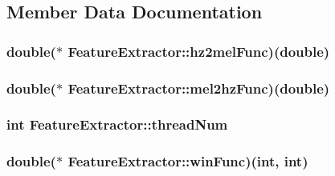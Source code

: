 \subsection{Member Data Documentation}
\hypertarget{class_feature_extractor_a5158d47cdf3ff7cfc48bde9c4169dfd2}{
\subsubsection[{hz2mel\+Func}]{\setlength{\rightskip}{0pt plus 5cm}double($\ast$ Feature\+Extractor\+::hz2mel\+Func)(double)\hspace{0.3cm}{\ttfamily [private]}}}\label{class_feature_extractor_a5158d47cdf3ff7cfc48bde9c4169dfd2}
\hypertarget{class_feature_extractor_a7b69346e500a23a96be63ebf891a069e}{
\subsubsection[{mel2hz\+Func}]{\setlength{\rightskip}{0pt plus 5cm}double($\ast$ Feature\+Extractor\+::mel2hz\+Func)(double)\hspace{0.3cm}{\ttfamily [private]}}}\label{class_feature_extractor_a7b69346e500a23a96be63ebf891a069e}
\hypertarget{class_feature_extractor_a1c4293f263166c151706379d01f561f0}{
\subsubsection[{thread\+Num}]{\setlength{\rightskip}{0pt plus 5cm}int Feature\+Extractor\+::thread\+Num\hspace{0.3cm}{\ttfamily [private]}}}\label{class_feature_extractor_a1c4293f263166c151706379d01f561f0}
\hypertarget{class_feature_extractor_a573d66a2731f098e798ac6c0bc683ec2}{
\subsubsection[{win\+Func}]{\setlength{\rightskip}{0pt plus 5cm}double($\ast$ Feature\+Extractor\+::win\+Func)(int, int)\hspace{0.3cm}{\ttfamily [private]}}}\label{class_feature_extractor_a573d66a2731f098e798ac6c0bc683ec2}
